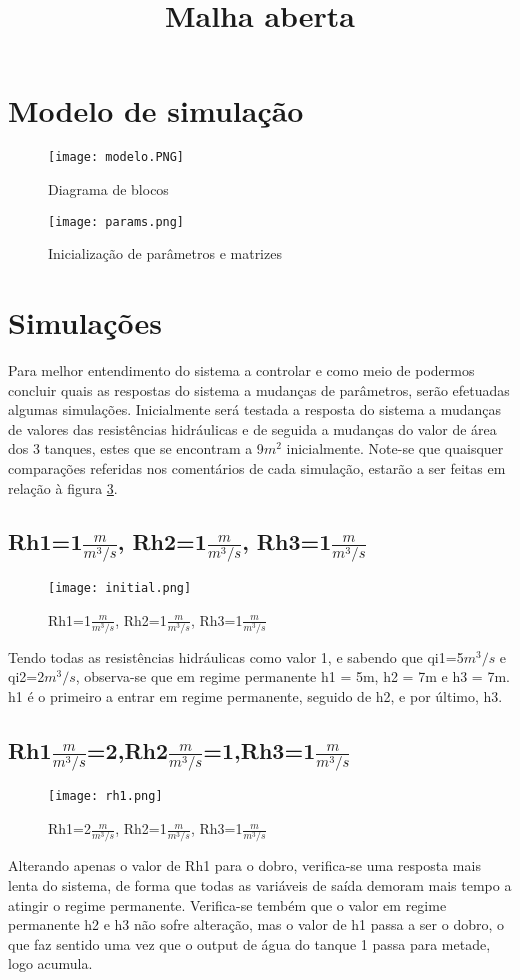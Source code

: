 \documentclass[11pt]{article}
\begin{document}
\title{Malha aberta}
\maketitle

\section{Modelo de simulação}
\begin{figure}[!h]
\begin{center}
\texttt{[image: modelo.PNG]}
\caption{Diagrama de blocos}
\label{fig1.1}
\end{center}
\end{figure}
\begin{figure}[!h]
\texttt{[image: params.png]}
\caption{Inicialização de parâmetros e matrizes}
\label{fig1.2}
\end{figure}

\pagebreak
\section{Simulações}
Para melhor entendimento do sistema a controlar e como meio de podermos concluir quais as respostas do sistema a mudanças de parâmetros, serão efetuadas algumas simulações.
Inicialmente será testada a resposta do sistema a mudanças de valores das resistências hidráulicas e de seguida a mudanças do valor de área dos 3 tanques, estes que se encontram a 9$m^2$ inicialmente.
Note-se que quaisquer comparações referidas nos comentários de cada simulação, estarão a ser feitas em relação à figura \ref{fig2.1}.
\subsection{Rh1=1$\frac{m}{m^3/s}$, Rh2=1$\frac{m}{m^3/s}$, Rh3=1$\frac{m}{m^3/s}$}
\begin{figure}[!h]
\texttt{[image: initial.png]}
\caption{Rh1=1$\frac{m}{m^3/s}$, Rh2=1$\frac{m}{m^3/s}$, Rh3=1$\frac{m}{m^3/s}$}
\label{fig2.1}
\end{figure}
Tendo todas as resistências hidráulicas como valor 1, e sabendo que qi1=5$m^3/s$ e qi2=2$m^3/s$, observa-se que em regime permanente h1 = 5m, h2 = 7m e h3 = 7m. h1 é o primeiro a entrar em regime permanente, seguido de h2, e  por último, h3.
\pagebreak
\subsection{Rh1$\frac{m}{m^3/s}$=2,Rh2$\frac{m}{m^3/s}$=1,Rh3=1$\frac{m}{m^3/s}$}
\begin{figure}[!h]
\texttt{[image: rh1.png]}
\caption{Rh1=2$\frac{m}{m^3/s}$, Rh2=1$\frac{m}{m^3/s}$, Rh3=1$\frac{m}{m^3/s}$}
\label{fig2.2}
\end{figure}
Alterando apenas o valor de Rh1 para o dobro, verifica-se uma resposta mais lenta do sistema, de forma que todas as variáveis de saída demoram mais tempo a atingir o regime permanente. Verifica-se tembém que o valor em regime permanente h2 e h3 não sofre alteração, mas o valor de h1 passa a ser o dobro, o que faz sentido uma vez que o output de água do tanque 1 passa para metade, logo acumula.
\pagebreak
\end{document}

